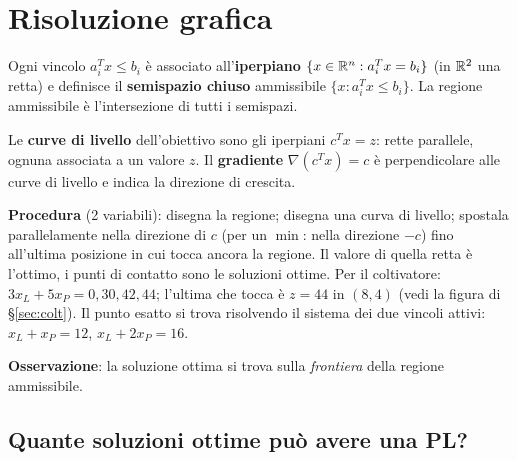 \section{Risoluzione grafica}

Ogni vincolo $a_i^Tx\le b_i$ è associato all'\textbf{iperpiano} $\{x\in\mathbb{R}^n:a_i^Tx=b_i\}$ (in $\mathbb{R}^2$ una retta) e definisce il \textbf{semispazio chiuso} ammissibile $\{x:a_i^Tx\le b_i\}$. La regione ammissibile è l'intersezione di tutti i semispazi.

Le \textbf{curve di livello} dell'obiettivo sono gli iperpiani $c^Tx=z$: rette parallele, ognuna associata a un valore $z$. Il \textbf{gradiente} $\nabla(c^Tx)=c$ è perpendicolare alle curve di livello e indica la direzione di crescita.

\textbf{Procedura} (2 variabili): disegna la regione; disegna una curva di livello; spostala parallelamente nella direzione di $c$ (per un $\min$: nella direzione $-c$) fino all'ultima posizione in cui tocca ancora la regione. Il valore di quella retta è l'ottimo, i punti di contatto sono le soluzioni ottime. Per il coltivatore: $3x_L+5x_P=0,30,42,44$; l'ultima che tocca è $z=44$ in $(8,4)$ (vedi la figura di \S\ref{sec:colt}). Il punto esatto si trova risolvendo il sistema dei due vincoli attivi: $x_L+x_P=12$, $x_L+2x_P=16$.

\textbf{Osservazione}: la soluzione ottima si trova sulla \emph{frontiera} della regione ammissibile.

\subsection{Quante soluzioni ottime può avere una PL?}

